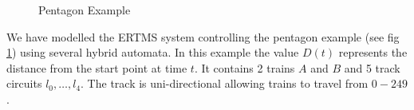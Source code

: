 \begin{figure} [h!]

\begin{center}
\end{center}

\label{fig:trackplan2}
 \caption{Pentagon Example}
\end{figure}

\begin{comment}



\def\r{3} 
\def\sone{ \sin 32}
\def\stwo{\sin 72}
\def\cone{\cos 32}
\def\ctwo{\cos 72}
\coordinate(top) at (0,\r);
\coordinate(topleft) at ({ \r * -cos (36)},{ \r * -sin (36)});
\coordinate(topright) at ({ \r * cos (72)}, { \r * -sin (72)});
\coordinate(botleft) at ({ \r * - cos (36)},{ \r * sin (36)});
\coordinate(botright) at ({\r * sin (72)},{\r * cos (72)});

\tikzstyle{box1}=[circle, draw, text width = 2cm, font=\scriptsize]
\tikzstyle{box3}=[rectangle, draw, text width = 2cm, font=\scriptsize]
\tikzstyle{arrow}=[->, thick]
\tikzstyle{biarrow}=[<->,very thick,shorten >=7pt,shorten <=7pt]


\node (A) [font = \scriptsize]  at (topleft)                  {D =150 };

\node (B) [font = \scriptsize]    at (botleft)          {D = 0};

\node (C)[font = \scriptsize] at (top)  { D = 100
						};

\node (D)[font = \scriptsize] at (botright)  { D = 50
						};

\node (E) [font = \scriptsize] at (topright) {D = 200};

\draw [arrow] (D) -- node[right] {$t_1$} (E);
\draw [arrow] (A) -- node[below = 10pt] {$t_4$} (B);
\draw [arrow] (B) --  node[above = 10pt] {$t_2$} (C);
\draw [arrow] (C) -- node [left] {$t_3$} (D);
\end{comment}
We have modelled the ERTMS system controlling the pentagon example (see fig \ref{fig:trackplan2}) using several hybrid automata. In this example the value $D(t)$ represents the distance from the start point at time $t$. 
It contains 2 trains $A$ and $B$ and 5 track circuits $l_0, \ldots , l_4$. The track is uni-directional allowing trains to travel from $0 - 249$. 
\medskip




